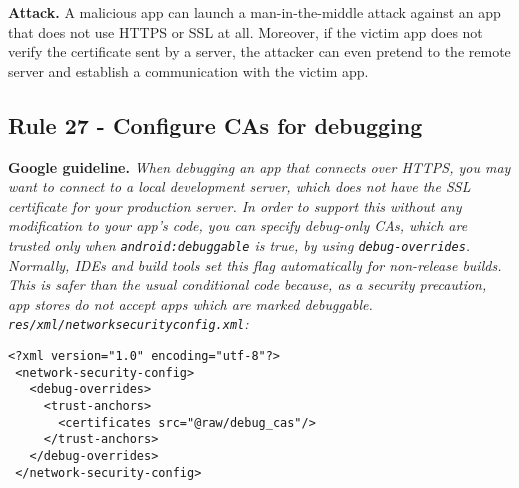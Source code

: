 \setcounter{algocf}{25}
\begin{algorithm}[]
\SetAlgoLined
{}
\caption{}
\label{algorithm26}
\end{algorithm}

\textbf{Attack.} A malicious app can launch a man-in-the-middle attack against an app that does not use HTTPS or SSL at all. Moreover, if the victim app does not verify the certificate sent by a server, the attacker can even pretend to the remote server and establish a communication with the victim app. 

\subsection{Rule 27 - Configure CAs for debugging} 
\textbf{Google guideline.} \emph{When debugging an app that connects over HTTPS, you may want to connect to a local development server, which does not have the SSL certificate for your production server. In order to support this without any modification to your app's code, you can specify debug-only CAs, which are trusted only when \texttt{android:debuggable} is true, by using \texttt{debug-overrides}. Normally, IDEs and build tools set this flag automatically for non-release builds.
\\
This is safer than the usual conditional code because, as a security precaution, app stores do not accept apps which are marked debuggable. 
\\
\texttt{res/xml/network\textunderscore security\textunderscore config.xml}:}
\begin{lstlisting}[language=XML_android, caption=Configure CAs for debugging, numbers=none]
 <?xml version="1.0" encoding="utf-8"?>
 <network-security-config>
   <debug-overrides>
     <trust-anchors>
       <certificates src="@raw/debug_cas"/>
     </trust-anchors>
   </debug-overrides>
 </network-security-config>

\end{lstlisting}

